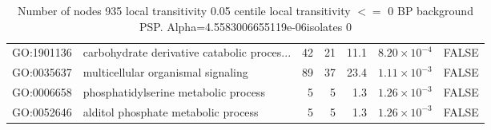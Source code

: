 \begin{table}[ht]
\begin{adjustbox}{max width=\textwidth}
\begin{tabular}{llrrrrl}
  GO:1901136 & carbohydrate derivative catabolic proces... & 42 & 21 & 11.1 & $8.20 \times 10^{-4}$ & FALSE \\ 
  GO:0035637 & multicellular organismal signaling & 89 & 37 & 23.4 & $1.11 \times 10^{-3}$ & FALSE \\ 
  GO:0006658 & phosphatidylserine metabolic process & 5 & 5 & 1.3 & $1.26 \times 10^{-3}$ & FALSE \\ 
  GO:0052646 & alditol phosphate metabolic process & 5 & 5 & 1.3 & $1.26 \times 10^{-3}$ & FALSE \\ 
   \hline
\end{tabular}
\end{adjustbox}
\caption{Number of nodes 935 local transitivity 0.05 centile  local transitivity $<=$ 0 BP background PSP. Alpha=4.5583006655119e-06isolates 0} 
\label{tab:Number of nodes 935 local transitivity 0.05 centile  local transitivity $<=$ 0 BP background PSP. Alpha=4.5583006655119e-06isolates 0}
\end{table}

